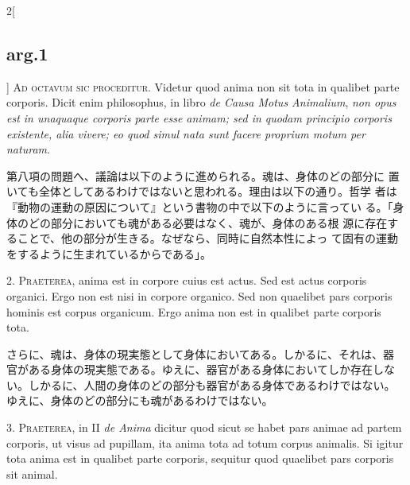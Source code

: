\documentclass[paper=a4paper,fontsize=10pt,jafontsize=9pt,titlepage]{jlreq}
\begin{document}
\begin{paracol}{2}[\subsection{arg.1}]
 {\scshape Ad octavum sic proceditur}. Videtur quod anima non sit tota
 in qualibet parte corporis. Dicit enim philosophus, in libro
 {\itshape de Causa Motus Animalium}, {\itshape non opus est in
 unaquaque corporis parte esse animam; sed in quodam principio
 corporis existente, alia vivere; eo quod simul nata sunt facere
 proprium motum per naturam}.

 \switchcolumn

 第八項の問題へ、議論は以下のように進められる。魂は、身体のどの部分に
 置いても全体としてあるわけではないと思われる。理由は以下の通り。哲学
 者は『動物の運動の原因について』という書物の中で以下のように言ってい
 る。「身体のどの部分においても魂がある必要はなく、魂が、身体のある根
 源に存在することで、他の部分が生きる。なぜなら、同時に自然本性によっ
 て固有の運動をするように生まれているからである」。
 



2. {\scshape Praeterea}, anima est in corpore cuius est actus. Sed est
actus corporis organici. Ergo non est nisi in corpore organico. Sed
non quaelibet pars corporis hominis est corpus organicum. Ergo anima
non est in qualibet parte corporis tota.

 \switchcolumn

さらに、魂は、身体の現実態として身体においてある。しかるに、それは、器
官がある身体の現実態である。ゆえに、器官がある身体においてしか存在しな
い。しかるに、人間の身体のどの部分も器官がある身体であるわけではない。
ゆえに、身体のどの部分にも魂があるわけではない。
 



3. {\scshape Praeterea}, in II {\itshape de Anima} dicitur quod sicut
se habet pars animae ad partem corporis, ut visus ad pupillam, ita
anima tota ad totum corpus animalis. Si igitur tota anima est in
qualibet parte corporis, sequitur quod quaelibet pars corporis sit
animal.


\end{paracol}
\end{document}
